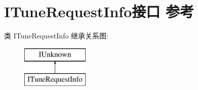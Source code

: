 \hypertarget{interface_i_tune_request_info}{}\section{I\+Tune\+Request\+Info接口 参考}
\label{interface_i_tune_request_info}
类 I\+Tune\+Request\+Info 继承关系图\+:\begin{figure}[H]
\begin{center}
\leavevmode
\includegraphics[height=2.000000cm]{interface_i_tune_request_info}
\end{center}
\end{figure}
